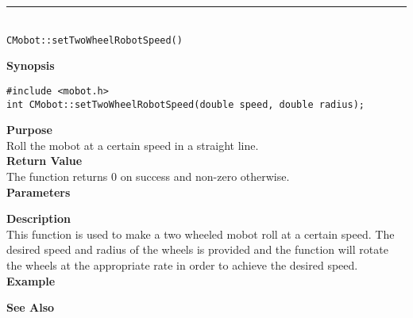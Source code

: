 \noindent
\vspace{5pt}
\rule{4.5in}{0.015in}\\
\noindent
{\LARGE \texttt{CMobot::setTwoWheelRobotSpeed()}}\\
{}

\noindent
{\bf Synopsis}
\vspace{-8pt}
\begin{verbatim}
#include <mobot.h>
int CMobot::setTwoWheelRobotSpeed(double speed, double radius);
\end{verbatim}

\noindent
{\bf Purpose}\\
Roll the mobot at a certain speed in a straight line.\\

\noindent
{\bf Return Value}\\
The function returns 0 on success and non-zero otherwise.\\

\noindent
{\bf Parameters}
\vspace{-0.1in}

\noindent
{\bf Description}\\
This function is used to make a two wheeled mobot roll at a certain speed. The desired 
speed and radius of the wheels is provided and the function will rotate the wheels at the
appropriate rate in order to achieve the desired speed.
\noindent\\
{\bf Example}\\
\noindent

\noindent
{\bf See Also}\\

